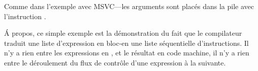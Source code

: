 Comme dans l'exemple avec MSVC---les arguments sont placés dans la pile avec l'instruction
\MOV.


Á propos, ce simple exemple est la démonstration du fait que le compilateur traduit
une liste d'expression en bloc-\CCpp en une liste séquentielle d'instructions.
Il n'y a rien entre les expressions en \CCpp, et le résultat en code machine,
il n'y a rien entre le déroulement du flux de contrôle d'une expression à la suivante.
